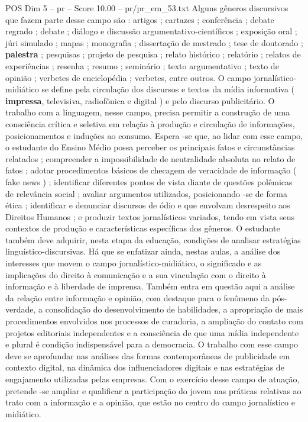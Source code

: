\begin{textsample}{POS Dim 5 – pr – Score 10.00 – pr/pr\_em\_53.txt}
Alguns gêneros discursivos que fazem parte desse campo são : artigos ; cartazes ; conferência ; debate regrado ; debate ; diálogo e discussão argumentativo-científicos ; exposição oral ; júri simulado ; mapas ; monografia ; dissertação de mestrado ; tese de doutorado ; \textbf{palestra} ; pesquisas ; projeto de pesquisa ; relato histórico ; relatório ; relatos de experiências ; resenha ; resumo ; seminário ; texto argumentativo ; texto de opinião ; verbetes de enciclopédia ; verbetes, entre outros.
O campo jornalístico-midiático se define pela circulação dos discursos e textos da mídia informativa ( \textbf{impressa}, televisiva, radiofônica e digital ) e pelo discurso publicitário.
O trabalho com a linguagem, nesse campo, precisa permitir a construção de uma consciência crítica e seletiva em relação à produção e circulação de informações, posicionamentos e induções ao consumo.
Espera -se que, ao lidar com esse campo, o estudante do Ensino Médio possa perceber os principais fatos e circunstâncias relatados ; compreender a impossibilidade de neutralidade absoluta no relato de fatos ; adotar procedimentos básicos de checagem de veracidade de informação ( fake news ) ; identificar diferentes pontos de vista diante de questões polêmicas de relevância social ; avaliar argumentos utilizados, posicionando -se de forma ética ; identificar e denunciar discursos de ódio e que envolvam desrespeito aos Direitos Humanos ; e produzir textos jornalísticos variados, tendo em vista seus contextos de produção e características específicas dos gêneros.
O estudante também deve adquirir, nesta etapa da educação, condições de analisar estratégias linguístico-discursivas.
Há que se enfatizar ainda, nestas aulas, a análise dos interesses que movem o campo jornalístico-midiático, o significado e as implicações do direito à comunicação e a sua vinculação com o direito à informação e à liberdade de imprensa.
Também entra em questão aqui a análise da relação entre informação e opinião, com destaque para o fenômeno da pós-verdade, a consolidação do desenvolvimento de habilidades, a apropriação de mais procedimentos envolvidos nos processos de curadoria, a ampliação do contato com projetos editoriais independentes e a consciência de que uma mídia independente e plural é condição indispensável para a democracia.
O trabalho com esse campo deve se aprofundar nas análises das formas contemporâneas de publicidade em contexto digital, na dinâmica dos influenciadores digitais e nas estratégias de engajamento utilizadas pelas empresas.
Com o exercício desse campo de atuação, pretende -se ampliar e qualificar a participação do jovem nas práticas relativas ao trato com a informação e a opinião, que estão no centro do campo jornalístico e midiático.

\end{textsample}
